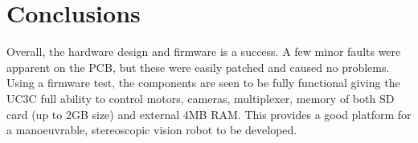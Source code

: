 \section{Conclusions}

Overall, the hardware design and firmware is a success. A few minor faults were apparent on the PCB, but these were easily patched and caused no problems. Using a firmware test, the components are seen to be fully functional giving the UC3C full ability to control motors, cameras, \itc multiplexer, memory of both SD card (up to 2GB size) and external 4MB RAM. This provides a good platform for a manoeuvrable, stereoscopic vision robot to be developed. 